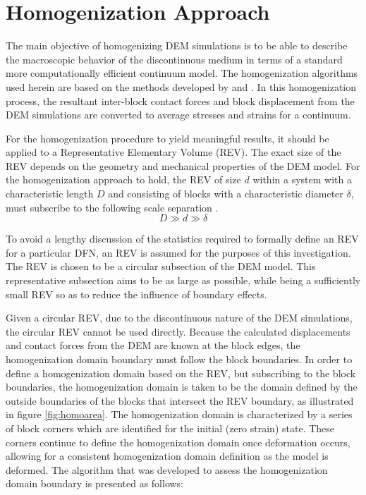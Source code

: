 \section{Homogenization Approach}

The main objective of homogenizing DEM simulations is to be able to
describe the macroscopic behavior of the discontinuous medium in terms
of a standard more computationally efficient continuum model. The
homogenization algorithms used herein are based on the methods developed
by \citet{daddetta_particle_2004} and \citet{wellmann_homogenization_2008}. In this
homogenization process, the resultant inter-block contact forces and
block displacement from the DEM simulations are converted to average
stresses and strains for a continuum.

For the homogenization procedure to yield meaningful results, it should
be applied to a Representative Elementary Volume (REV). The exact size of the REV depends on the geometry
and mechanical properties of the DEM model. For the homogenization
approach to hold, the REV of size $d$ within a system with a characteristic
length $D$ and consisting of blocks with a characteristic diameter
$\delta$, must subscribe to the following scale separation \cite{wellmann_homogenization_2008}. 
\begin{equation}
D\gg d\gg\delta\label{eqn:hom1a}
\end{equation}


To avoid a lengthy discussion of the statistics required to formally define an REV for a particular DFN, an REV is assumed for the purposes of this investigation. The REV is chosen to be a circular subsection of the DEM model. This representative subsection aims to be as large as possible, while being a sufficiently small REV so as to reduce the influence of boundary effects.

Given a circular REV, due to the discontinuous nature of the DEM
simulations, the circular REV cannot be used directly. Because the
calculated displacements and contact forces from the DEM are known
at the block edges, the homogenization domain boundary must follow
the block boundaries. In order to define a homogenization domain based
on the REV, but subscribing to the block boundaries, the homogenization
domain is taken to be the domain defined by the outside boundaries
of the blocks that intersect the REV boundary, as illustrated in figure \ref{fig:homoarea}.
The homogenization domain is characterized by a series of block corners
which are identified for the initial (zero strain) state. These corners
continue to define the homogenization domain once deformation occurs,
allowing for a consistent homogenization domain definition as the
model is deformed. The algorithm that was developed to assess the
homogenization domain boundary is presented as follows: 

